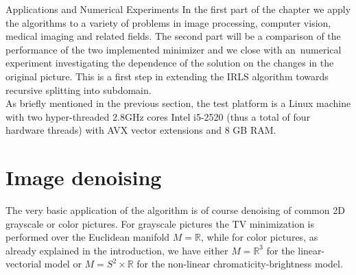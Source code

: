 \begin{chapter}{Applications and Numerical Experiments}
\label{ch:numericalexperiments}
In the first part of the chapter we apply the algorithms to a variety of problems in image processing, computer vision, medical imaging and related fields.
The second part will be a comparison of the performance of the two implemented minimizer and we close with an\ numerical experiment investigating the 
dependence of the solution on the changes in the original picture. This is a first step in extending the IRLS algorithm towards recursive splitting into subdomain.\\

As briefly mentioned in the previous section, the test platform is a Linux machine with two hyper-threaded 2.8GHz cores Intel i5-2520 (thus a total of four hardware threads)
with AVX vector extensions and 8 GB RAM. 


\section{Image denoising} %
\label{sec:image denoising}
The very basic application of the algorithm is of course denoising of common 2D grayscale or color pictures.
For grayscale pictures the TV minimization is performed over the Euclidean manifold $M=\mathbb{R}$, while for color
pictures, as already explained in the introduction, we have either $M=\mathbb{R}^3$ for the linear-vectorial model or
$M=S^2\times\mathbb{R}$ for the non-linear chromaticity-brightness model.


\end{chapter}
